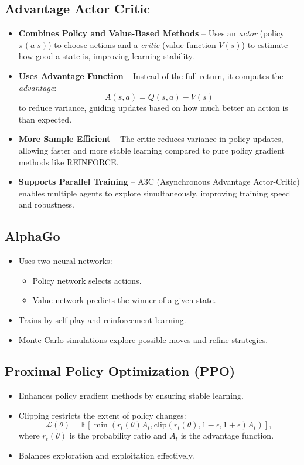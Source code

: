 \documentclass[12pt,a4paper]{article}
\begin{document}
\subsection{Advantage Actor Critic}
    \begin{itemize}
    \item \textbf{Combines Policy and Value-Based Methods} – Uses an \textit{actor} (policy \( \pi(a|s) \)) to choose actions and a \textit{critic} (value function \( V(s) \)) to estimate how good a state is, improving learning stability.
    
    \item \textbf{Uses Advantage Function} – Instead of the full return, it computes the \textit{advantage}:
    \[
    A(s, a) = Q(s, a) - V(s)
    \]
    to reduce variance, guiding updates based on how much better an action is than expected.

    \item \textbf{More Sample Efficient} – The critic reduces variance in policy updates, allowing faster and more stable learning compared to pure policy gradient methods like REINFORCE.
    
    \item \textbf{Supports Parallel Training} – A3C (Asynchronous Advantage Actor-Critic) enables multiple agents to explore simultaneously, improving training speed and robustness.
\end{itemize}

\subsection{AlphaGo}
\begin{itemize}
    \item Uses two neural networks:
    \begin{itemize}
        \item Policy network selects actions.
        \item Value network predicts the winner of a given state.
    \end{itemize}
    \item Trains by self-play and reinforcement learning.
    \item Monte Carlo simulations explore possible moves and refine strategies.
\end{itemize}
\subsection{Proximal Policy Optimization (PPO)}
\begin{itemize}
    \item Enhances policy gradient methods by ensuring stable learning.
    \item Clipping restricts the extent of policy changes:
    \[ \mathcal{L}(\theta) = \mathbb{E}[\min(r_t(\theta)A_t, \text{clip}(r_t(\theta), 1 - \epsilon, 1 + \epsilon)A_t)], \]
    where $r_t(\theta)$ is the probability ratio and $A_t$ is the advantage function.
    \item Balances exploration and exploitation effectively.
\end{itemize}
\end{document}
